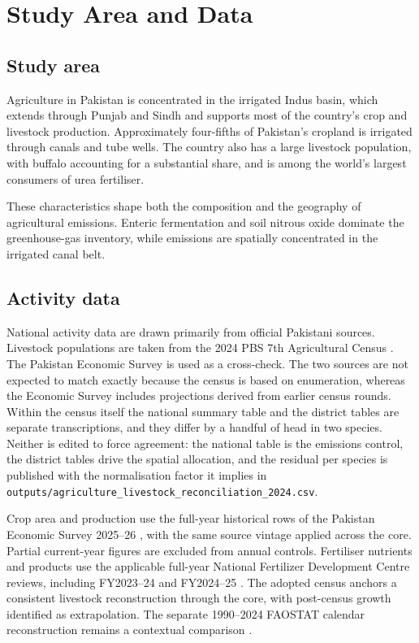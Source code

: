 \section{Study Area and Data}
\label{sec:data}

\subsection{Study area}

Agriculture in Pakistan is concentrated in the irrigated Indus basin, which extends through
Punjab and Sindh and supports most of the country's crop and livestock production.
Approximately four-fifths of Pakistan's cropland is irrigated through canals and tube wells.
The country also has a large livestock population, with buffalo accounting for a substantial
share, and is among the world's largest consumers of urea fertiliser.

These characteristics shape both the composition and the geography of agricultural
emissions. Enteric fermentation and soil nitrous oxide dominate the greenhouse-gas
inventory, while emissions are spatially concentrated in the irrigated canal belt.

\subsection{Activity data}

National activity data are drawn primarily from official Pakistani sources. Livestock
populations are taken from the 2024 PBS 7th Agricultural Census \citep{pbscensus2024}. The
Pakistan Economic Survey \citep{econsurvey2024ag} is used as a cross-check. The two sources are
not expected to match exactly because the census is based on enumeration, whereas the
Economic Survey includes projections derived from earlier census rounds.
Within the census itself the national summary table and the district tables are separate
transcriptions, and they differ by a handful of head in two species. Neither is edited to force
agreement: the national table is the emissions control, the district tables drive the spatial
allocation, and the residual per species is published with the normalisation factor it implies in
\texttt{outputs/agriculture\_livestock\_reconciliation\_2024.csv}.

Crop area and production use the full-year historical rows of the Pakistan Economic
Survey 2025--26 \citep{peseconomic2026}, with the same source vintage applied across
the core. Partial current-year figures are excluded from annual controls. Fertiliser
nutrients and products use the applicable full-year National Fertilizer Development
Centre reviews, including FY2023--24 and FY2024--25 \citep{nfdc2024,nfdc2025}.
The adopted census anchors a consistent livestock reconstruction through the core,
with post-census growth identified as extrapolation. The separate 1990--2024
FAOSTAT calendar reconstruction remains a contextual comparison \citep{faostat}.

